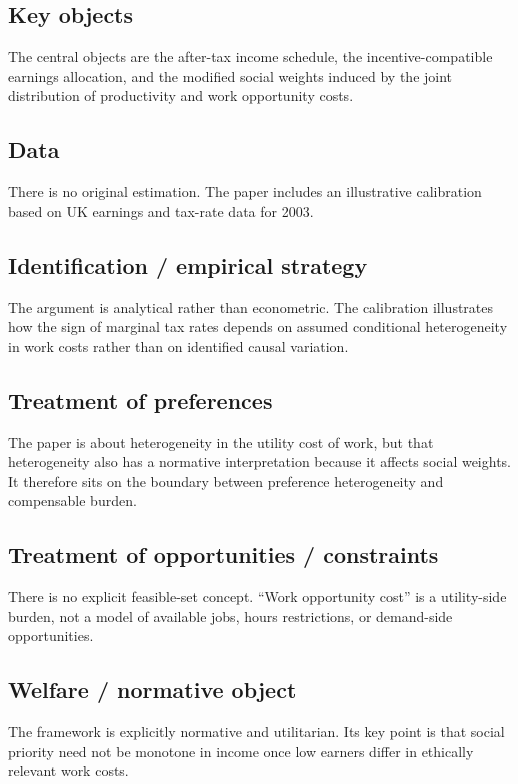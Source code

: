 \documentclass[11pt,a4paper]{article}
\begin{document}
\subsection*{Key objects}
The central objects are the after-tax income schedule, the incentive-compatible earnings allocation, and the modified social weights induced by the joint distribution of productivity and work opportunity costs.

\subsection*{Data}
There is no original estimation. The paper includes an illustrative calibration based on UK earnings and tax-rate data for 2003.

\subsection*{Identification / empirical strategy}
The argument is analytical rather than econometric. The calibration illustrates how the sign of marginal tax rates depends on assumed conditional heterogeneity in work costs rather than on identified causal variation.

\subsection*{Treatment of preferences}
The paper is about heterogeneity in the utility cost of work, but that heterogeneity also has a normative interpretation because it affects social weights. It therefore sits on the boundary between preference heterogeneity and compensable burden.

\subsection*{Treatment of opportunities / constraints}
There is no explicit feasible-set concept. “Work opportunity cost” is a utility-side burden, not a model of available jobs, hours restrictions, or demand-side opportunities.

\subsection*{Welfare / normative object}
The framework is explicitly normative and utilitarian. Its key point is that social priority need not be monotone in income once low earners differ in ethically relevant work costs.
\end{document}
